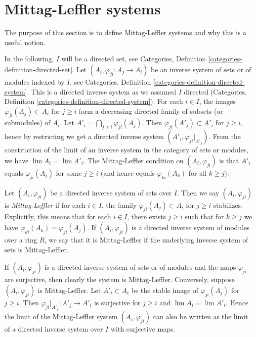 \section{Mittag-Leffler systems}
\label{section-mittag-leffler}

\noindent
The purpose of this section is to define Mittag-Leffler systems
and why this is a useful notion.

\medskip\noindent
In the following, $I$ will be a directed set, see
Categories, Definition \ref{categories-definition-directed-set}.
Let $(A_i, \varphi_{ji}: A_j \to A_i)$ be an inverse
system of sets or of modules indexed by $I$, see
Categories, Definition \ref{categories-definition-directed-system}.
This is a directed inverse system as we assumed $I$ directed
(Categories, Definition \ref{categories-definition-directed-system}).
For each $i \in I$, the images $\varphi_{ji}(A_j) \subset A_i$ for $j \geq i$
form a decreasing directed family of subsets (or submodules) of $A_i$. Let
$A'_i = \bigcap_{j \geq i} \varphi_{ji}(A_j)$.
Then $\varphi_{ji}(A'_j) \subset A'_i$ for $j \geq i$, hence by restricting
we get a directed inverse system $(A'_i, \varphi_{ji}|_{A'_j})$.
From the construction of the limit of an inverse system in the category
of sets or modules, we have $\lim A_i = \lim A'_i$.  The Mittag-Leffler
condition on $(A_i, \varphi_{ji})$ is that $A'_i$ equals
$\varphi_{ji}(A_j)$ for some $j \geq i$ (and hence equals
$\varphi_{ki}(A_k)$ for all $k \geq j$):

\begin{definition}
\label{definition-ML-system}
Let $(A_i, \varphi_{ji})$ be a directed inverse system of sets over $I$.  Then
we say  $(A_i, \varphi_{ji})$ is {\it Mittag-Leffler} if for
each $i \in I$, the family $\varphi_{ji}(A_j) \subset A_i$ for
$j \geq i$ stabilizes.  Explicitly, this means that for each $i \in I$, there
exists $j \geq i$ such that for $k \geq j$ we have $\varphi_{ki}(A_k) =
\varphi_{ji}( A_j)$.  If $(A_i, \varphi_{ji})$ is a directed inverse system
of modules over a ring $R$, we say that it is Mittag-Leffler if the underlying
inverse system of sets is Mittag-Leffler.
\end{definition}

\begin{example}
\label{example-ML-surjective-maps}
If $(A_i, \varphi_{ji})$ is a directed inverse system of sets or of modules and
the maps $\varphi_{ji}$ are surjective, then clearly the system is
Mittag-Leffler.  Conversely, suppose $(A_i, \varphi_{ji})$ is Mittag-Leffler.
Let $A'_i \subset A_i$ be the stable image of $\varphi_{ji}(A_j)$ for $j \geq
i$.  Then $\varphi_{ji}|_{A'_j}: A'_j \to A'_i$ is surjective for
$j \geq i$ and $\lim A_i = \lim A'_i$.  Hence the limit of the Mittag-Leffler
system $(A_i, \varphi_{ji})$ can also be written as the limit of a directed
inverse system over $I$ with surjective maps.
\end{example}


